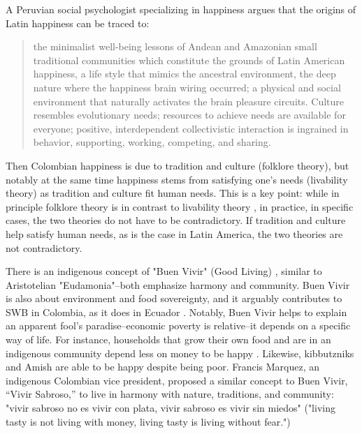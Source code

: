 \documentclass[10pt, letterpaper]{article}
\begin{document}
\begin{spacing}{2}
A Peruvian social psychologist specializing in happiness argues that the origins
of Latin happiness can be traced to:
\begin{quote}
  the minimalist well-being lessons of Andean and Amazonian small traditional
  communities which constitute the grounds of Latin American happiness, a life
  style that mimics the ancestral environment, the deep nature where the
  happiness brain wiring occurred; a physical and social environment that
  naturally activates the brain pleasure circuits. Culture resembles evolutionary
  needs; resources to achieve needs are available for everyone; positive,
  interdependent collectivistic interaction is ingrained in behavior,
  supporting, working, competing, and sharing. \citep[][p.45]{yamamoto16}
\end{quote}
Then Colombian happiness is due to tradition and culture (folklore theory), but
notably at the same time happiness stems from satisfying one's needs (livability theory) as
tradition and culture fit human needs.
 This is a key point: while in principle folklore theory is in contrast to
 livability theory \citep{veenhoven95}, in practice, in specific cases, the two
 theories do not have to be contradictory. If tradition and culture help
 satisfy human needs, as is the case in Latin America, the two theories are not contradictory.  

There is an indigenous concept of "Buen Vivir" (Good Living) \citep{hidalgo17},
similar to Aristotelian "Eudamonia"--both emphasize harmony and community. Buen
Vivir is also about environment and food sovereignty, and it arguably
contributes to SWB in Colombia, as it does in Ecuador
\citep{guardiola14}. Notably, Buen Vivir helps to explain an apparent fool's
paradise--economic poverty is relative--it depends on a specific way of
life. For instance, households that grow their own food and are in an indigenous
community depend less on money to be happy \citep{garcia18}. 
 {Likewise, kibbutzniks \citep{morawetz77} and 
   Amish \citep{surowiecki2005technology} are able to be happy despite being poor. 
 }
%
Francis Marquez, an indigenous Colombian vice president, proposed a similar concept to Buen Vivir, ``Vivir Sabroso,'' to live in harmony with
nature, traditions, and community: "vivir sabroso no es vivir con
plata, vivir sabroso es vivir sin miedos" ("living tasty is not living with
money, living tasty is living without fear.")


\end{spacing}
\end{document}
